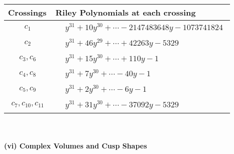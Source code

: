 \documentclass[1p]{elsarticle_modified}
\theoremstyle{definition}
\begin{document}
\begin{tabular}{m{50pt}|m{274pt}}
Crossings & \hspace{64pt}Riley Polynomials at each crossing \\
\hline $$\begin{aligned}c_{1}\end{aligned}$$&$\begin{aligned}
&y^{31}+10 y^{30}+\cdots-2147483648 y-1073741824
\end{aligned}$\\
\hline $$\begin{aligned}c_{2}\end{aligned}$$&$\begin{aligned}
&y^{31}+46 y^{29}+\cdots+42263 y-5329
\end{aligned}$\\
\hline $$\begin{aligned}c_{3},c_{6}\end{aligned}$$&$\begin{aligned}
&y^{31}+15 y^{30}+\cdots+110 y-1
\end{aligned}$\\
\hline $$\begin{aligned}c_{4},c_{8}\end{aligned}$$&$\begin{aligned}
&y^{31}+7 y^{30}+\cdots-40 y-1
\end{aligned}$\\
\hline $$\begin{aligned}c_{5},c_{9}\end{aligned}$$&$\begin{aligned}
&y^{31}+2 y^{30}+\cdots-6 y-1
\end{aligned}$\\
\hline $$\begin{aligned}c_{7},c_{10},c_{11}\end{aligned}$$&$\begin{aligned}
&y^{31}+31 y^{30}+\cdots-37092 y-5329
\end{aligned}$\\
\hline
\end{tabular}\\~\\
\newpage\flushleft \textbf{(vi) Complex Volumes and Cusp Shapes}
\end{document}
